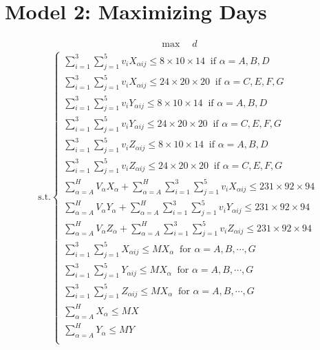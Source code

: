 \documentclass{mcmthesis}
\begin{document}
\section{Model 2: Maximizing Days}

\[
\begin{aligned}
\max\quad d
\end{aligned}
\]
\[
\begin{aligned}
\text{s.t.}
\left\{
\begin{array}{lr}
\sum\limits_{i=1}^{3}\sum\limits_{j=1}^{5}v_{i}X_{\alpha ij}\le 8\times 10\times 14\ \text{ if }\alpha=A,B,D \\
\sum\limits_{i=1}^{3}\sum\limits_{j=1}^{5}v_{i}X_{\alpha ij}\le 24\times 20\times 20\ \text{ if }\alpha=C,E,F,G \\
\sum\limits_{i=1}^{3}\sum\limits_{j=1}^{5}v_{i}Y_{\alpha ij}\le 8\times 10\times 14\ \text{ if }\alpha=A,B,D \\
\sum\limits_{i=1}^{3}\sum\limits_{j=1}^{5}v_{i}Y_{\alpha ij}\le 24\times 20\times 20\ \text{ if }\alpha=C,E,F,G \\
\sum\limits_{i=1}^{3}\sum\limits_{j=1}^{5}v_{i}Z_{\alpha ij}\le 8\times 10\times 14\ \text{ if }\alpha=A,B,D \\
\sum\limits_{i=1}^{3}\sum\limits_{j=1}^{5}v_{i}Z_{\alpha ij}\le 24\times 20\times 20\ \text{ if }\alpha=C,E,F,G \\
\sum\limits_{\alpha=A}^{H}V_{\alpha}X_{\alpha}+\sum\limits_{\alpha=A}^{H}\sum\limits_{i=1}^{3}\sum\limits_{j=1}^{5}v_{i}X_{\alpha ij}\le 231\times92\times 94\\
\sum\limits_{\alpha=A}^{H}V_{\alpha}Y_{\alpha}+\sum\limits_{\alpha=A}^{H}\sum\limits_{i=1}^{3}\sum\limits_{j=1}^{5}v_{i}Y_{\alpha ij}\le 231\times92\times 94\\
\sum\limits_{\alpha=A}^{H}V_{\alpha}Z_{\alpha}+\sum\limits_{\alpha=A}^{H}\sum\limits_{i=1}^{3}\sum\limits_{j=1}^{5}v_{i}Z_{\alpha ij}\le 231\times92\times 94\\
\sum\limits_{i=1}^{3}\sum\limits_{j=1}^{5}X_{\alpha ij}\le M X_{\alpha}\ \text{ for }\alpha=A,B,\cdots, G\\
\sum\limits_{i=1}^{3}\sum\limits_{j=1}^{5}Y_{\alpha ij}\le M X_{\alpha}\ \text{ for }\alpha=A,B,\cdots, G\\
\sum\limits_{i=1}^{3}\sum\limits_{j=1}^{5}Z_{\alpha ij}\le M X_{\alpha}\ \text{ for }\alpha=A,B,\cdots, G\\
\sum\limits_{\alpha=A}^{H}X_\alpha\le MX\\
\sum\limits_{\alpha=A}^{H}Y_\alpha\le MY\\

\end{array}
\end{aligned}\]
\end{document}
